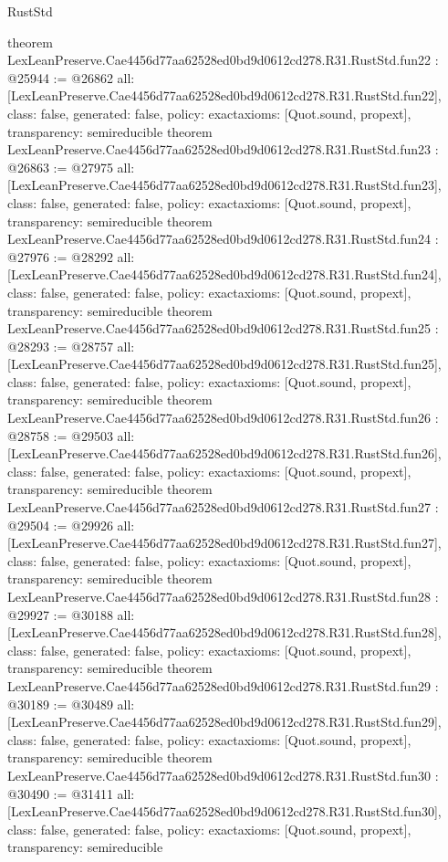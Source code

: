 \begin{lexlean}{RustStd}
\begin{coremodule}
{}
theorem LexLeanPreserve.Cae4456d77aa62528ed0bd9d0612cd278.R31.RustStd.fun22 : @25944 := @26862 {
  all: [LexLeanPreserve.Cae4456d77aa62528ed0bd9d0612cd278.R31.RustStd.fun22],
  class: false,
  generated: false,
  policy: exact{axioms: [Quot.sound, propext]},
  transparency: semireducible
}
theorem LexLeanPreserve.Cae4456d77aa62528ed0bd9d0612cd278.R31.RustStd.fun23 : @26863 := @27975 {
  all: [LexLeanPreserve.Cae4456d77aa62528ed0bd9d0612cd278.R31.RustStd.fun23],
  class: false,
  generated: false,
  policy: exact{axioms: [Quot.sound, propext]},
  transparency: semireducible
}
theorem LexLeanPreserve.Cae4456d77aa62528ed0bd9d0612cd278.R31.RustStd.fun24 : @27976 := @28292 {
  all: [LexLeanPreserve.Cae4456d77aa62528ed0bd9d0612cd278.R31.RustStd.fun24],
  class: false,
  generated: false,
  policy: exact{axioms: [Quot.sound, propext]},
  transparency: semireducible
}
theorem LexLeanPreserve.Cae4456d77aa62528ed0bd9d0612cd278.R31.RustStd.fun25 : @28293 := @28757 {
  all: [LexLeanPreserve.Cae4456d77aa62528ed0bd9d0612cd278.R31.RustStd.fun25],
  class: false,
  generated: false,
  policy: exact{axioms: [Quot.sound, propext]},
  transparency: semireducible
}
theorem LexLeanPreserve.Cae4456d77aa62528ed0bd9d0612cd278.R31.RustStd.fun26 : @28758 := @29503 {
  all: [LexLeanPreserve.Cae4456d77aa62528ed0bd9d0612cd278.R31.RustStd.fun26],
  class: false,
  generated: false,
  policy: exact{axioms: [Quot.sound, propext]},
  transparency: semireducible
}
theorem LexLeanPreserve.Cae4456d77aa62528ed0bd9d0612cd278.R31.RustStd.fun27 : @29504 := @29926 {
  all: [LexLeanPreserve.Cae4456d77aa62528ed0bd9d0612cd278.R31.RustStd.fun27],
  class: false,
  generated: false,
  policy: exact{axioms: [Quot.sound, propext]},
  transparency: semireducible
}
theorem LexLeanPreserve.Cae4456d77aa62528ed0bd9d0612cd278.R31.RustStd.fun28 : @29927 := @30188 {
  all: [LexLeanPreserve.Cae4456d77aa62528ed0bd9d0612cd278.R31.RustStd.fun28],
  class: false,
  generated: false,
  policy: exact{axioms: [Quot.sound, propext]},
  transparency: semireducible
}
theorem LexLeanPreserve.Cae4456d77aa62528ed0bd9d0612cd278.R31.RustStd.fun29 : @30189 := @30489 {
  all: [LexLeanPreserve.Cae4456d77aa62528ed0bd9d0612cd278.R31.RustStd.fun29],
  class: false,
  generated: false,
  policy: exact{axioms: [Quot.sound, propext]},
  transparency: semireducible
}
theorem LexLeanPreserve.Cae4456d77aa62528ed0bd9d0612cd278.R31.RustStd.fun30 : @30490 := @31411 {
  all: [LexLeanPreserve.Cae4456d77aa62528ed0bd9d0612cd278.R31.RustStd.fun30],
  class: false,
  generated: false,
  policy: exact{axioms: [Quot.sound, propext]},
  transparency: semireducible
}
\end{coremodule}
\end{lexlean}
